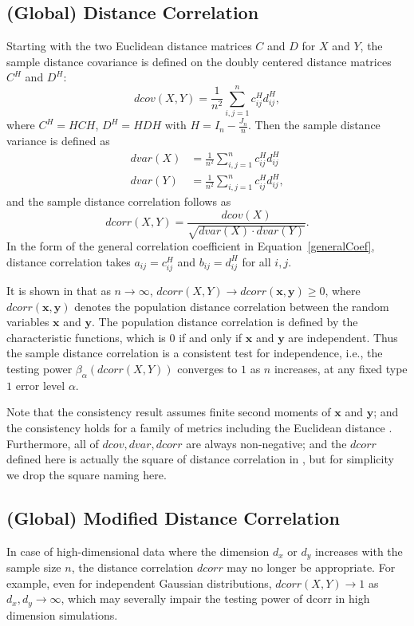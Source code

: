\documentclass[11pt]{article}
\providecommand{\mb}[1]{\boldsymbol{#1}}
\begin{document}
\subsection{(Global) Distance Correlation}
\label{main1}
Starting with the two Euclidean distance matrices $C$ and $D$ for $X$ and $Y$, the sample distance covariance is defined on the doubly centered distance matrices $C^{H}$ and $D^{H}$:
\begin{equation}
\label{dcovEqu}
dcov(X,Y)=\frac{1}{n^2}\sum_{i,j=1}^{n}c^{H}_{ij}d^{H}_{ij},
\end{equation}
where $C^{H}=HCH$, $D^{H}=HDH$ with $H=I_{n}-\frac{J_{n}}{n}$. Then the sample distance variance is defined as
\begin{align*}
dvar(X) &=\frac{1}{n^2}\sum_{i,j=1}^{n}c^{H}_{ij}d^{H}_{ij}\\
dvar(Y) &=\frac{1}{n^2}\sum_{i,j=1}^{n}c^{H}_{ij}d^{H}_{ij},
\end{align*}
and the sample distance correlation follows as
\begin{equation}
\label{dcorrEqu}
dcorr(X,Y)=\frac{dcov(X)}{\sqrt{dvar(X) \cdot dvar(Y)}}.
\end{equation}
In the form of the general correlation coefficient in Equation~\ref{generalCoef}, distance correlation takes $a_{ij}=c^{H}_{ij}$ and $b_{ij}=d^{H}_{ij}$ for all $i,j$.

It is shown in \cite{SzekelyRizzoBakirov2007} that as $n \rightarrow \infty$, $dcorr(X,Y) \rightarrow dcorr(\mb{x},\mb{y}) \geq 0$, where $dcorr(\mb{x},\mb{y})$ denotes the population distance correlation between the random variables $\mb{x}$ and $\mb{y}$. The population distance correlation is defined by the characteristic functions, which is $0$ if and only if $\mb{x}$ and $\mb{y}$ are independent. Thus the sample distance correlation is a consistent test for independence, i.e., the testing power $\beta_{\alpha}(dcorr(X,Y))$ converges to $1$ as $n$ increases, at any fixed type $1$ error level $\alpha$. 

Note that the consistency result assumes finite second moments of $\mb{x}$ and $\mb{y}$; and the consistency holds for a family of metrics including the Euclidean distance \cite{Lyons2013}. Furthermore, all of $dcov, dvar, dcorr$ are always non-negative; and the $dcorr$ defined here is actually the square of distance correlation in \cite{SzekelyRizzoBakirov2007}, but for simplicity we drop the square naming here.

\subsection{(Global) Modified Distance Correlation}
\label{sec:gmd}
In case of high-dimensional data where the dimension $d_{x}$ or $d_{y}$ increases with the sample size $n$, the distance correlation $dcorr$ may no longer be appropriate. For example, even for independent Gaussian distributions, $dcorr(X,Y) \rightarrow 1$ as $d_{x}, d_{y} \rightarrow \infty$, which may severally impair the testing power of dcorr in high dimension simulations.
\end{document}
